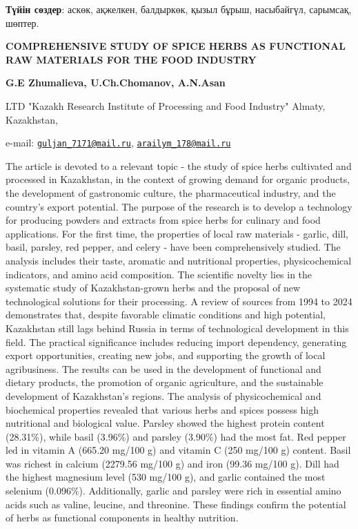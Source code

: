 {\bfseries Түйін сөздер}: аскөк, ақжелкен, балдыркөк, қызыл бұрыш,
насыбайгүл, сарымсақ, шөптер.

\begin{articleheader}
{\bfseries COMPREHENSIVE STUDY OF SPICE HERBS AS FUNCTIONAL RAW MATERIALS
FOR THE FOOD INDUSTRY}

{\bfseries
G.E Zhumalieva\textsuperscript{\envelope },
U.Ch.Chomanov,
A.N.Asan\textsuperscript{\envelope }
}
\end{articleheader}

\begin{affiliation}
LTD "Kazakh Research Institute of Processing and Food Industry" Almaty, Kazakhstan,

e-mail:
\href{mailto:guljan_7171@mail.ru}{\nolinkurl{guljan\_7171@mail.ru}},
\href{mailto:arailym_178@mail.ru}{\nolinkurl{arailym\_178@mail.ru}}
\end{affiliation}

The article is devoted to a relevant topic - the study of spice herbs
cultivated and processed in Kazakhstan, in the context of growing demand
for organic products, the development of gastronomic culture, the
pharmaceutical industry, and the country's export potential. The purpose
of the research is to develop a technology for producing powders and
extracts from spice herbs for culinary and food applications. For the
first time, the properties of local raw materials - garlic, dill, basil,
parsley, red pepper, and celery - have been comprehensively studied. The
analysis includes their taste, aromatic and nutritional properties,
physicochemical indicators, and amino acid composition. The scientific
novelty lies in the systematic study of Kazakhstan-grown herbs and the
proposal of new technological solutions for their processing. A review
of sources from 1994 to 2024 demonstrates that, despite favorable
climatic conditions and high potential, Kazakhstan still lags behind
Russia in terms of technological development in this field. The
practical significance includes reducing import dependency, generating
export opportunities, creating new jobs, and supporting the growth of
local agribusiness. The results can be used in the development of
functional and dietary products, the promotion of organic agriculture,
and the sustainable development of Kazakhstan's regions. The analysis of
physicochemical and biochemical properties revealed that various herbs
and spices possess high nutritional and biological value. Parsley showed
the highest protein content (28.31\%), while basil (3.96\%) and parsley
(3.90\%) had the most fat. Red pepper led in vitamin A (665.20 mg/100 g)
and vitamin C (250 mg/100 g) content. Basil was richest in calcium
(2279.56 mg/100 g) and iron (99.36 mg/100 g). Dill had the highest
magnesium level (530 mg/100 g), and garlic contained the most selenium
(0.096\%). Additionally, garlic and parsley were rich in essential amino
acids such as valine, leucine, and threonine. These findings confirm the
potential of herbs as functional components in healthy nutrition.

